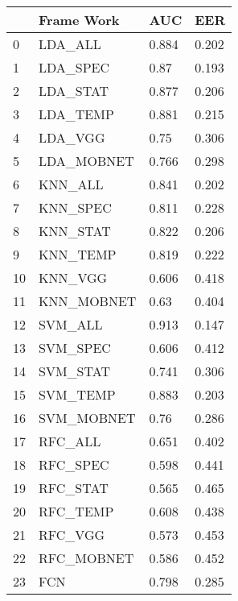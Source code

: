 \begin{tabular}{llll}
\toprule
{} &  Frame Work &    AUC &    EER \\
\midrule
0  &     LDA\_ALL &  0.884 &  0.202 \\
1  &    LDA\_SPEC &   0.87 &  0.193 \\
2  &    LDA\_STAT &  0.877 &  0.206 \\
3  &    LDA\_TEMP &  0.881 &  0.215 \\
4  &     LDA\_VGG &   0.75 &  0.306 \\
5  &  LDA\_MOBNET &  0.766 &  0.298 \\\bottomrule
6  &     KNN\_ALL &  0.841 &  0.202 \\
7  &    KNN\_SPEC &  0.811 &  0.228 \\
8  &    KNN\_STAT &  0.822 &  0.206 \\
9  &    KNN\_TEMP &  0.819 &  0.222 \\
10 &     KNN\_VGG &  0.606 &  0.418 \\
11 &  KNN\_MOBNET &   0.63 &  0.404 \\\bottomrule
12 &     SVM\_ALL &  0.913 &  0.147 \\
13 &    SVM\_SPEC &  0.606 &  0.412 \\
14 &    SVM\_STAT &  0.741 &  0.306 \\
15 &    SVM\_TEMP &  0.883 &  0.203 \\
16 &  SVM\_MOBNET &   0.76 &  0.286 \\\bottomrule
17 &     RFC\_ALL &  0.651 &  0.402 \\
18 &    RFC\_SPEC &  0.598 &  0.441 \\
19 &    RFC\_STAT &  0.565 &  0.465 \\
20 &    RFC\_TEMP &  0.608 &  0.438 \\
21 &     RFC\_VGG &  0.573 &  0.453 \\
22 &  RFC\_MOBNET &  0.586 &  0.452 \\\bottomrule
23 &         FCN &  0.798 &  0.285 \\
\bottomrule
\end{tabular}
